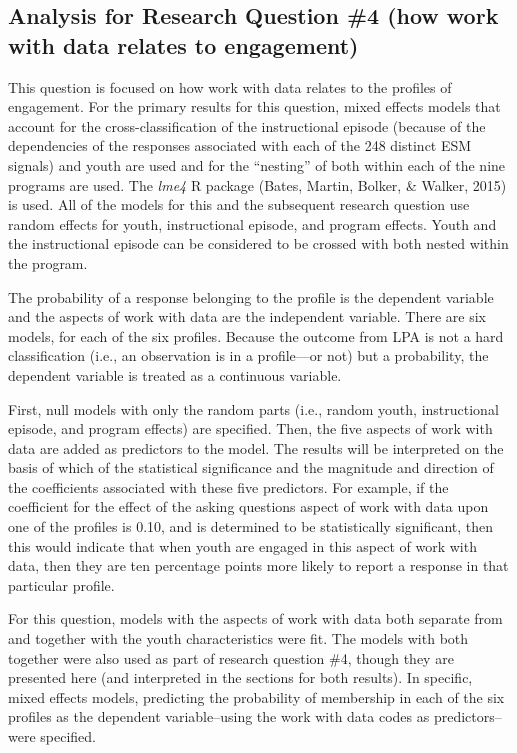\documentclass[]{msu-thesis}
\theoremstyle{definition}
\theoremstyle{definition}
\theoremstyle{definition}
\theoremstyle{remark}
\begin{document}
\subsection{Analysis for Research Question \#4 (how work with data
relates to
engagement)}\label{analysis-for-research-question-4-how-work-with-data-relates-to-engagement}

This question is focused on how work with data relates to the profiles
of engagement. For the primary results for this question, mixed effects
models that account for the cross-classification of the instructional
episode (because of the dependencies of the responses associated with
each of the 248 distinct ESM signals) and youth are used and for the
``nesting'' of both within each of the nine programs are used. The
\emph{lme4} R package (Bates, Martin, Bolker, \& Walker, 2015) is used.
All of the models for this and the subsequent research question use
random effects for youth, instructional episode, and program effects.
Youth and the instructional episode can be considered to be crossed with
both nested within the program.

The probability of a response belonging to the profile is the dependent
variable and the aspects of work with data are the independent variable.
There are six models, for each of the six profiles. Because the outcome
from LPA is not a hard classification (i.e., an observation is in a
profile---or not) but a probability, the dependent variable is treated
as a continuous variable.

First, null models with only the random parts (i.e., random youth,
instructional episode, and program effects) are specified. Then, the
five aspects of work with data are added as predictors to the model. The
results will be interpreted on the basis of which of the statistical
significance and the magnitude and direction of the coefficients
associated with these five predictors. For example, if the coefficient
for the effect of the asking questions aspect of work with data upon one
of the profiles is 0.10, and is determined to be statistically
significant, then this would indicate that when youth are engaged in
this aspect of work with data, then they are ten percentage points more
likely to report a response in that particular profile.

For this question, models with the aspects of work with data both
separate from and together with the youth characteristics were fit. The
models with both together were also used as part of research question
\#4, though they are presented here (and interpreted in the sections for
both results). In specific, mixed effects models, predicting the
probability of membership in each of the six profiles as the dependent
variable--using the work with data codes as predictors--were specified.
\end{document}

